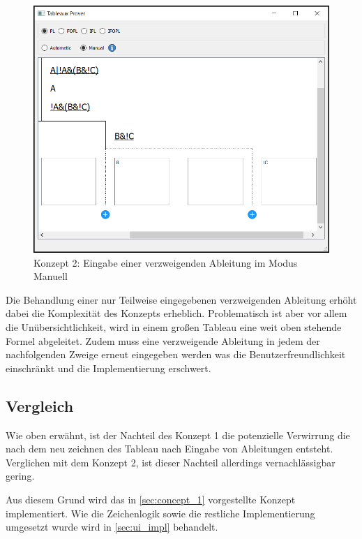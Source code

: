 \begin{figure}[h]
\begin{center}
\includegraphics[scale=0.7]{images/gui_concept_2_manual_enter_branch.png}
\caption{Konzept 2: Eingabe einer verzweigenden Ableitung im Modus Manuell}
\label{fig:gui_concept_2_manual_enter_branch}
\end{center}
\end{figure}

Die Behandlung einer nur Teilweise eingegebenen verzweigenden Ableitung erhöht dabei die Komplexität des Konzepts erheblich. Problematisch ist aber vor allem die Unübersichtlichkeit, wird in einem großen Tableau eine weit oben stehende Formel abgeleitet. Zudem muss eine verzweigende Ableitung in jedem der nachfolgenden Zweige erneut eingegeben werden was die Benutzerfreundlichkeit einschränkt und die Implementierung erschwert.

\subsection{Vergleich}
Wie oben erwähnt, ist der Nachteil des Konzept 1 die potenzielle Verwirrung die nach dem neu zeichnen des Tableau nach Eingabe von Ableitungen entsteht. Verglichen mit dem Konzept 2, ist dieser Nachteil allerdings vernachlässigbar gering.

Aus diesem Grund wird das in \autoref{sec:concept_1} vorgestellte Konzept implementiert. Wie die Zeichenlogik sowie die restliche Implementierung umgesetzt wurde wird in \autoref{sec:ui_impl} behandelt.

